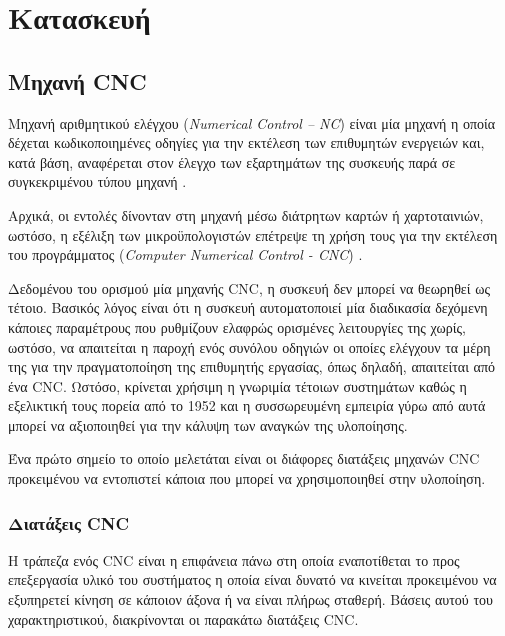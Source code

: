 \chapter{Κατασκευή}

\section{Μηχανή CNC}

Μηχανή αριθμητικού ελέγχου (\emph{Numerical Control -- NC}) είναι μία μηχανή η οποία δέχεται κωδικοποιημένες οδηγίες για την
εκτέλεση των επιθυμητών ενεργειών και, κατά βάση, αναφέρεται στον έλεγχο των
εξαρτημάτων της συσκευής παρά σε συγκεκριμένου τύπου μηχανή
\parencites{seames01}{albert11}.

Αρχικά, οι εντολές δίνονταν στη μηχανή μέσω διάτρητων καρτών ή χαρτοταινιών,
ωστόσο, η εξέλιξη των μικροϋπολογιστών επέτρεψε τη χρήση τους για την εκτέλεση
του προγράμματος (\emph{Computer Numerical Control - CNC}) \parencite{seames01}.


Δεδομένου του ορισμού μία μηχανής CNC, η συσκευή δεν μπορεί να θεωρηθεί ως
τέτοιο. Βασικός λόγος είναι ότι η συσκευή αυτοματοποιεί μία διαδικασία δεχόμενη
κάποιες παραμέτρους που ρυθμίζουν ελαφρώς ορισμένες λειτουργίες της χωρίς,
ωστόσο, να απαιτείται η παροχή ενός συνόλου οδηγιών οι οποίες ελέγχουν τα μέρη
της για την πραγματοποίηση της επιθυμητής εργασίας, όπως δηλαδή, απαιτείται από
ένα CNC.
Ωστόσο, κρίνεται χρήσιμη η γνωριμία τέτοιων συστημάτων καθώς η εξελικτική τους
πορεία από το 1952 και η συσσωρευμένη εμπειρία γύρω από αυτά μπορεί να
αξιοποιηθεί για την κάλυψη των αναγκών της υλοποίησης.

Ένα πρώτο σημείο το οποίο μελετάται είναι οι διάφορες διατάξεις μηχανών CNC
προκειμένου να εντοπιστεί κάποια που μπορεί να χρησιμοποιηθεί στην υλοποίηση.


\subsection{Διατάξεις CNC}

Η τράπεζα ενός CNC είναι η επιφάνεια πάνω στη οποία εναποτίθεται το προς
επεξεργασία υλικό του συστήματος η οποία είναι δυνατό να κινείται προκειμένου να
εξυπηρετεί κίνηση σε κάποιον άξονα ή να είναι πλήρως σταθερή. Βάσεις αυτού του
χαρακτηριστικού, διακρίνονται οι παρακάτω διατάξεις CNC.

